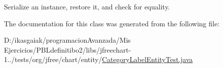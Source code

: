 Serialize an instance, restore it, and check for equality. 

The documentation for this class was generated from the following file\+:\begin{DoxyCompactItemize}
\item 
D\+:/ikasgaiak/programacion\+Avanzada/\+Mis Ejercicios/\+P\+B\+Ldefinitibo2/libs/jfreechart-\/1../tests/org/jfree/chart/entity/\mbox{\hyperlink{_category_label_entity_test_8java}{Category\+Label\+Entity\+Test.\+java}}\end{DoxyCompactItemize}
